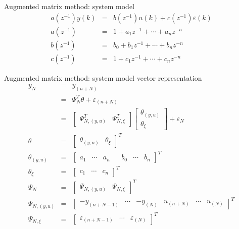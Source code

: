 \begin{frame}{ Augmented matrix method: system model }
\begin{eqnarray*}
a(z^{-1})y(k) &=& b(z^{-1})u(k)+c(z^{-1})\varepsilon(k) \\
a(z^{-1}) &=& 1 + a_1 z^{-1} + \cdots + a_n z^{-n} \\
b(z^{-1}) &=& b_0 + b_1 z^{-1} + \cdots + b_n z^{-n} \\
c(z^{-1}) &=& 1 + c_1 z^{-1} + \cdots + c_n z^{-n} 
\end{eqnarray*}
\end{frame}

\begin{frame}{ Augmented matrix method: system model vector representation }
\begin{eqnarray*}
y_{N} &=& y_{(n+N)} \\
&=& \Psi_N^T\theta +\varepsilon_{(n+N)} \\
&=& \begin{bmatrix} \Psi_{N,(y,u)}^T & \Psi_{N,\xi}^T\end{bmatrix}\begin{bmatrix}\theta_{(y,u)} \\ \theta_\xi \end{bmatrix} + \varepsilon_N \\
\theta &=&\begin{bmatrix}\theta_{(y,u)} & \theta_\xi\end{bmatrix}^T \\
\theta_{(y,u)} &=&\begin{bmatrix}a_1 & \cdots & a_n & & b_0 & \cdots & b_n \end{bmatrix}^T \\
\theta_\xi &=&\begin{bmatrix} c_1 &\cdots & c_n\end{bmatrix}^T \\
\Psi_N &=&\begin{bmatrix} \Psi_{N,(y,u)} &\Psi_{N,\xi} \end{bmatrix}^T \\
\Psi_{N,(y,u)} &=&\begin{bmatrix}-y_{(n+N-1)} & \cdots & -y_{(N)} & u_{(n+N)} &\cdots & u_{(N)} \end{bmatrix}^T \\
\Psi_{N,\xi} &=&\begin{bmatrix} \varepsilon_{(n+N-1)} & \cdots & \varepsilon_{(N)} \end{bmatrix}^T  
\end{eqnarray*}
\end{frame}


